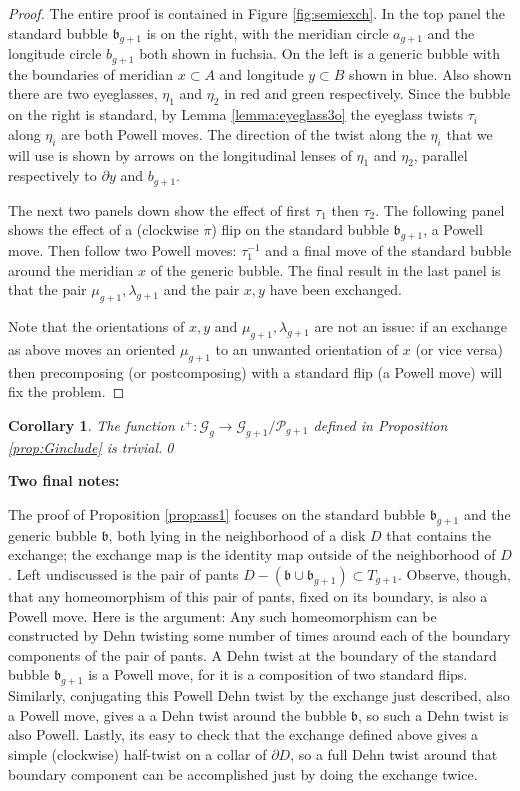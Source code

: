 \documentclass[12pt]{amsart}
\newtheorem{cor}[thm]{Corollary}
\newcommand{\calG}{\mathcal G}
\newcommand{\calP}{\mathcal P}
\newcommand{\bs}{\backslash}
\newcommand{\bdd}{\mbox{$\partial$}}
\newcommand{\frb}{\mathfrak{b}}
\begin{document}
\begin{proof}  The entire proof is contained in Figure \ref{fig:semiexch}.  In the top panel the standard bubble $\frb_{g+1}$ is on the right, with the meridian circle $a_{g+1}$ and the longitude circle $b_{g+1}$ both shown in fuchsia.  On the left is a generic bubble with the boundaries of meridian $x \subset A$ and longitude $y \subset B$ shown in blue.  Also shown there are two eyeglasses, $\eta_1$ and $\eta_2$ in red and green respectively.  Since the bubble on the right is standard, by Lemma \ref{lemma:eyeglass3o} the eyeglass twists $\tau_i$ along $\eta_i$ are both Powell moves.  The direction of the twist along the $\eta_i$ that we will use is shown by arrows on the longitudinal lenses of $\eta_1$ and $\eta_2$, parallel respectively to $\bdd y$ and $b_{g+1}$.  

The next two panels down show the effect of first $\tau_1$ then $\tau_2$.  The following panel shows the effect of a (clockwise $\pi$) flip on the standard bubble $\frb_{g+1}$, a Powell move.  Then follow two Powell moves: $\tau_1^{-1}$ and a final move of the standard bubble around the meridian $x$ of the generic bubble.  The final result in the last panel is that the pair $\mu_{g+1}, \lambda_{g+1}$ and the pair $x, y$ have been exchanged.  

Note that the orientations of $x, y$ and $\mu_{g+1}, \lambda_{g+1}$ are not an issue: if an exchange as above moves an oriented $\mu_{g+1}$ to an unwanted orientation of $x$ (or vice versa) then precomposing (or postcomposing) with a standard flip (a Powell move) will fix the problem.
\end{proof}


\begin{cor} The function $\iota^+: \calG_g \to %
    \calG_{g+1}/\calP_{g+1}$ defined in Proposition \ref{prop:Ginclude} is trivial.\qed
\end{cor}

{\bf Two final notes:}

The proof of Proposition \ref{prop:ass1} focuses on the standard bubble $\frb_{g+1}$ and the generic bubble $\frb$, both lying in the neighborhood of a disk $D$ that contains the exchange; the exchange map is the identity map outside of the neighborhood of $D$.  Left undiscussed is the pair of pants $D - (\frb \cup \frb_{g+1}) \subset T_{g+1}$. Observe, though, that any homeomorphism of this pair of pants, fixed on its boundary, is also a Powell move.  Here is the argument:  Any such homeomorphism can be constructed by Dehn twisting some number of times around each of the boundary components of the pair of pants.  A Dehn twist at the boundary of the standard bubble $\frb_{g+1}$ is a Powell move, for it is a composition of two standard flips.  Similarly, conjugating this Powell Dehn twist by the exchange just described, also a Powell move, gives a a Dehn twist around the bubble $\frb$, so such a Dehn twist is also Powell.  Lastly, its easy to check that the exchange defined above gives a simple (clockwise) half-twist on a collar of $\bdd D$, so a full Dehn twist around that boundary component can be accomplished just by doing the exchange twice.  
\medskip
\end{document}
